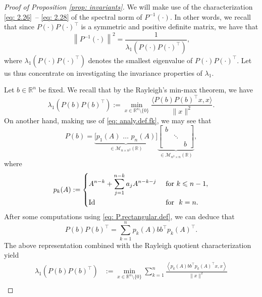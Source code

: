 \documentclass[11pt, a4paper, reqno]{amsart}
\newcommand{\R}{\mathbb{R}}
\theoremstyle{plain}
\numberwithin{equation}{section}
\begin{document}
	\begin{proof}[Proof of Proposition \ref{prop: invariants}]
	We will make use of the characterization \eqref{eq: 2.26} -- \eqref{eq: 2.28} of the spectral norm of $P^{-1}(\cdot)$. In other words, we recall that since $P(\cdot)P(\cdot)^\top$ is a symmetric and positive definite matrix, we have that
	\begin{equation}
	\left\|P^{-1}(\cdot)\right\|^2 = \frac{1}{\lambda_1\left(P(\cdot)P(\cdot)^\top\right)},
	\end{equation}
	where $\lambda_1\left(P(\cdot)P(\cdot)^\top\right)$ denotes the smallest eigenvalue of $P(\cdot)P(\cdot)^\top$.
	Let us thus concentrate on investigating the invariance properties of $\lambda_1$. 
	
	Let $b\in\R^n$ be fixed. We recall that by the Rayleigh's min-max theorem, we have
	\begin{equation*}
	\lambda_1\left(P(b)P(b)^\top\right) := 
	 \min_{x \in \R^n \setminus\{0\}} \frac{\langle P(b)P(b)^\top x, x\rangle}{\|x\|^2}.
	 \end{equation*}
	 On another hand, making use of \eqref{eq: analy.def.fk}, we may see that  
	\begin{equation} \label{eq: P.rectangular.def}
	P(b) = \underbrace{\big[p_1(A)\,\, \ldots\,\, p_n(A)\big]}_{\in \mathcal{M}_{n\times n^2}(\R)} \underbrace{\begin{bmatrix} b & &\\
	 &\ddots & \\
	 & & b
	 \end{bmatrix}}_{\in\mathcal{M}_{n^2\times n}(\R)},
	\end{equation}
	where 
	\begin{equation}
	p_k(A) := \begin{dcases}A^{n-k} + \sum_{j=1}^{n-k} a_{j} A^{n-k-j} &\text{ for } k\leqslant n-1,\\
	\text{Id} &\text{ for } k=n.
	\end{dcases}
	\end{equation}
	After some computations using \eqref{eq: P.rectangular.def}, we can deduce that
	\begin{equation} \label{eq: pp*.char}
	P(b)P(b)^\top = \sum_{k=1}^n p_k(A)bb^\top p_k(A)^\top.
	\end{equation}
	The above representation combined with the Rayleigh quotient characterization yield
	\begin{align*}
	\lambda_1\left(P(b)P(b)^\top\right) &:= \min_{x \in \R^n \setminus\{0\}} \sum_{k=1}^n \frac{\left\langle p_k(A)bb^\top p_k(A)^\top x, x\right\rangle}{\|x\|^2}\\

\end{align*}
\end{proof}
\end{document}
